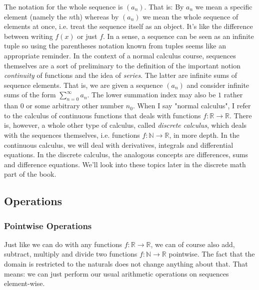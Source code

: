\medskip
The notation for the whole sequence is $(a_n)$. That is: By $a_n$ we mean a specific element (namely the $n$th) whereas by $(a_n)$ we mean the whole sequence of elements at once, i.e. treat the sequence itself as an object. It's like the difference between writing $f(x)$ or just $f$. In a sense, a sequence can be seen as an infinite tuple so using the parentheses notation known from tuples seems like an appropriate reminder. In the context of a normal calculus course, sequences themselves are a sort of preliminary to the definition of the important notion \emph{continuity} of functions and the idea of \emph{series}. The latter are infinite sums of sequence elements. That is, we are given a sequence $(a_n)$ and consider infinite sums of the form $\sum_{n=0}^{\infty} a_n$. The lower summation index may also be $1$ rather than $0$ or some arbitrary other number $n_0$. When I say "normal calculus", I refer to the calculus of continuous functions that deals with functions $f: \mathbb{R} \rightarrow \mathbb{R}$. There is, however, a whole other type of calculus, called \emph{discrete calculus}, which deals with the sequences themselves, i.e. functions $f: \mathbb{N} \rightarrow \mathbb{R}$, in more depth. In the continuous calculus, we will deal with derivatives, integrals and differential equations. In the discrete calculus, the analogous concepts are differences, sums and difference equations. We'll look into these topics later in the discrete math part of the book. 


\subsection{Operations}

\subsubsection{Pointwise Operations}
Just like we can do with any functions $f: \mathbb{R} \rightarrow \mathbb{R}$, we can of course also add, subtract, multiply and divide two functions $f: \mathbb{N} \rightarrow \mathbb{R}$ pointwise. The fact that the domain is restricted to the naturals does not change anything about that. That means: we can just perform our usual arithmetic operations on sequences element-wise.

